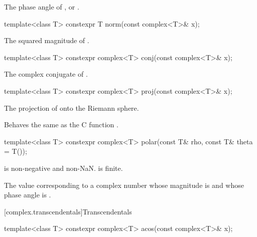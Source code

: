 \begin{itemdescr}
\pnum
\returns
The phase angle of , or .
\end{itemdescr}

%
\begin{itemdecl}
template<class T> constexpr T norm(const complex<T>& x);
\end{itemdecl}

\begin{itemdescr}
\pnum
\returns
The squared magnitude of .
\end{itemdescr}

%
\begin{itemdecl}
template<class T> constexpr complex<T> conj(const complex<T>& x);
\end{itemdecl}

\begin{itemdescr}
\pnum
\returns
The complex conjugate of .
\end{itemdescr}

%
\begin{itemdecl}
template<class T> constexpr complex<T> proj(const complex<T>& x);
\end{itemdecl}

\begin{itemdescr}
\pnum
\returns
The projection of  onto the Riemann sphere.

\pnum
\remarks
Behaves the same as the C function .
\end{itemdescr}

%
\begin{itemdecl}
template<class T> constexpr complex<T> polar(const T& rho, const T& theta = T());
\end{itemdecl}

\begin{itemdescr}
\pnum
\expects
{} is non-negative and non-NaN\@.  is finite.

\pnum
\returns
The
value corresponding
to a complex number whose magnitude is  and whose phase angle
is .
\end{itemdescr}

[complex.transcendentals]{Transcendentals}

%
%
\begin{itemdecl}
template<class T> constexpr complex<T> acos(const complex<T>& x);
\end{itemdecl}

